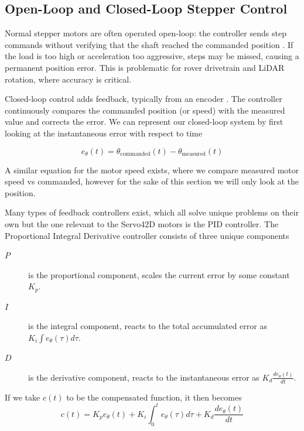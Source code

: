 \subsection{Open-Loop and Closed-Loop Stepper Control}
Normal stepper motors are often operated open-loop: the controller sends step commands without verifying that the shaft reached the commanded position \cite{StepperBasics}.
If the load is too high or acceleration too aggressive, steps may be missed, causing a permanent position error. 
This is problematic for rover drivetrain and LiDAR rotation, where accuracy is critical.

Closed-loop control adds feedback, typically from an encoder \cite{Makerbase}.
The controller continuously compares the commanded position (or speed) with the measured value and corrects the error. 
We can represent our closed-loop system by first looking at the instantaneous error with respect to time

\begin{equation}
    e_{\theta}(t) = \theta_{\mathrm{commanded}}(t) - \theta_{\mathrm{measured}}(t)
\end{equation}

A similar equation for the motor speed exists, where we compare measured motor speed vs commanded, however for the sake of this section we will only look at the position.

Many types of feedback controllers exist, which all solve unique problems on their own but the one relevant to the Servo42D motors is the PID controller.
The Proportional Integral Derivative controller consists of three unique components \cite{PIDUMich}

\begin{description}
    \item[$P$] is the proportional component, scales the current error by some constant \(K_p\).
    \item[$I$] is the integral component, reacts to the total accumulated error as \(K_i \int e_\theta(\tau) d\tau\).
    \item[$D$] is the derivative component, reacts to the instantaneous error as \(K_d \frac{d e_\theta (t)}{dt}\). 
\end{description}
If we take \(c(t)\) to be the compensated function, it then becomes
\begin{equation}
    c(t) = K_p e_\theta(t) + K_i \int_0^t e_\theta(\tau)d\tau + K_d \frac{de_\theta(t)}{dt}
\end{equation}

